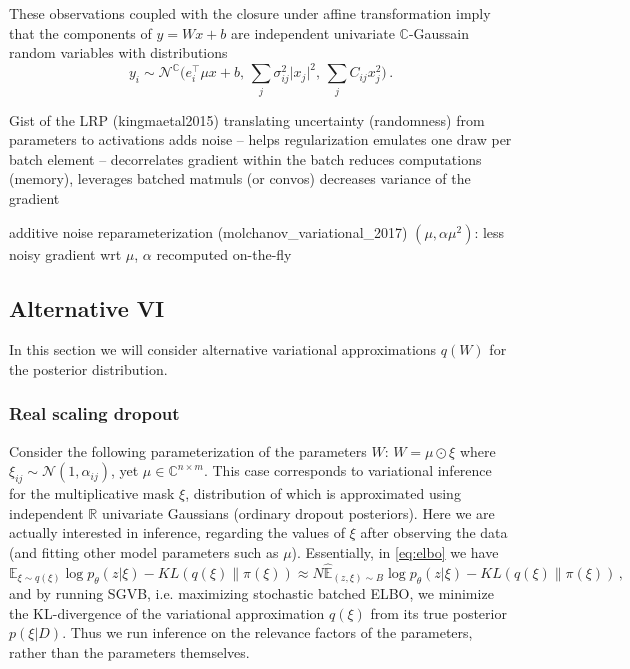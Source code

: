 \documentclass[a4paper,10pt]{article}
\newcommand{\real}{\mathbb{R}}
\newcommand{\cplx}{\mathbb{C}}
\begin{document}
These observations coupled with the closure under affine transformation imply
that the components of $y = W x + b$ are independent univariate $\cplx$-Gaussain
random variables with distributions
$$
y_i
  \sim \mathcal{N}^{\cplx}
    \bigl(
      e_i^\top \mu x + b,
      \, \sum_j \sigma^2_{ij} \lvert x_j \rvert^2,
      \, \sum_j C_{ij} x_j^2
    \bigr)
  \,. $$

Gist of the LRP (kingmaetal2015)
translating uncertainty (randomness) from parameters to activations
  adds noise -- helps regularization
  emulates one draw per batch element -- decorrelates gradient within the batch
  reduces computations (memory), leverages batched matmuls (or convos)
  decreases variance of the gradient

additive noise reparameterization (molchanov\_variational\_2017) $(\mu, \alpha \mu^2)$:
  less noisy gradient wrt $\mu$, $\alpha$ recomputed on-the-fly


\subsection{Alternative VI} %
\label{sub:alternative_vi}

In this section we will consider alternative variational approximations $q(W)$ for
the posterior distribution.

\subsubsection{Real scaling dropout} %
\label{ssub:real_scaling_dropout}

Consider the following parameterization of the parameters $W$: $
  W = \mu \odot \xi
$ where $
  \xi_{ij} \sim \mathcal{N}(1, \alpha_{ij})
$, yet $\mu \in \cplx^{n \times m}$. This case corresponds to variational inference for
the multiplicative mask $\xi$, distribution of which is approximated using independent
$\real$ univariate Gaussians (ordinary dropout posteriors). Here we are actually
interested in inference, regarding the values of $\xi$ after observing the data (and
fitting other model parameters such as $\mu$). Essentially, in \eqref{eq:elbo}
we have
$$
\mathbb{E}_{\xi \sim q(\xi)}
  \log p_\theta(z \vert \xi)
  - KL(q(\xi) \| \pi(\xi))
  \approx
    N \hat{\mathbb{E}}_{(z, \xi) \sim B}
      \log p_\theta(z \vert \xi)
    - KL(q(\xi) \| \pi(\xi))
  \,, $$
and by running SGVB, i.e. maximizing stochastic batched ELBO, we minimize the KL-divergence
of the variational approximation $q(\xi)$ from its true posterior $p(\xi\vert D)$. Thus
we run inference on the relevance factors of the parameters, rather than the parameters
themselves.
\end{document}
